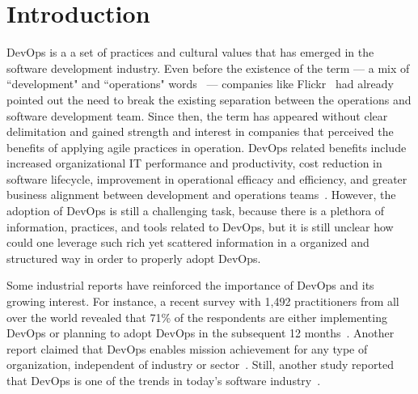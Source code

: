 \section{Introduction} \label{sec:introduction}

DevOps is a a set of practices and cultural values that has emerged in the
software development industry. Even before
the existence of the term --- a mix of ``development" and ``operations"
words~\cite{httermann2012devops} --- companies like Flickr~\cite{flickr}
had already pointed out the need to break the existing separation between
the operations and software development team. Since then, the term
has appeared without clear delimitation and gained strength and interest
in companies that perceived the benefits of applying agile practices in
operation. DevOps related benefits include increased organizational IT
performance and productivity, cost reduction in software lifecycle, improvement
in operational efficacy and efficiency, and greater business alignment between
development and operations teams~\cite{characterizing_devops_sbes_2016}.
However, the adoption of DevOps is still a challenging task, because there is a
plethora of information, practices, and tools related to DevOps, but it is still unclear
how could one leverage such rich yet scattered information in a organized and
structured way in order to properly adopt DevOps.


Some industrial reports have reinforced the importance of DevOps and its
growing interest. For instance, a recent survey with 1,492 practitioners from
all over the world revealed
that 71\% of the respondents are either implementing DevOps or
planning to adopt DevOps in the subsequent 12 months~\cite{state_of_agile}.
Another report claimed that DevOps enables mission achievement
for any type of organization, independent of industry or sector~\cite{state_of_devops}.
Still, another study reported that DevOps is one of the trends in
today's software industry~\cite{stackoverflow_2018}.


